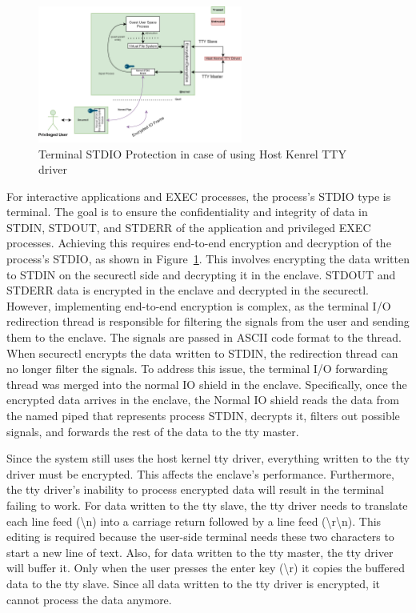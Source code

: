 \begin{figure}[H]
    \centering
    \includegraphics[width=0.6\textwidth]{images/terminal_shiled2.png}
    \caption[Terminal STDIO Protection in case of using Host Kenrel TTY Driver]{Terminal STDIO Protection in case of using Host Kenrel TTY driver}
    \label{fig:terminal_shiled2}
\end{figure}

For interactive applications and EXEC processes, the process's STDIO type is terminal. The goal is to ensure the confidentiality and integrity of data in STDIN, STDOUT, and STDERR of the application and privileged EXEC processes. Achieving this 
requires end-to-end encryption and decryption of the process's STDIO, as shown in Figure~\ref{fig:terminal_shiled2}. This involves encrypting the data written to STDIN on the securectl side and decrypting it in the enclave. STDOUT and STDERR data is encrypted in the enclave and decrypted in the 
securectl. However, implementing end-to-end encryption is complex, as the terminal I/O redirection thread is responsible for filtering the signals from the user and sending them to the enclave. The signals are passed in ASCII code format to the 
thread. When securectl encrypts the data written to STDIN, the redirection thread can no longer filter the signals. To address this issue, the terminal I/O forwarding thread was merged into the normal IO shield in the enclave. Specifically, once 
the encrypted data arrives in the enclave, the Normal IO shield reads the data from the named piped that represents process STDIN, decrypts it, filters out possible signals, and forwards the rest of the data to the tty master.

Since the system still uses the host kernel tty driver, everything written to the tty driver must be encrypted. This affects the enclave's performance. Furthermore, the tty driver's inability to process encrypted data will result in the terminal 
failing to work. For data written to the tty slave, the tty driver needs to translate each line feed (\textbackslash n) into a carriage return followed by a line feed (\textbackslash r\textbackslash n). This editing is required because the user-side terminal needs these two characters 
to start a new line of text. Also, for data written to the tty master, the tty driver will buffer it. Only when the user presses the enter key (\textbackslash r) it copies the buffered data to the tty slave. Since all data written to the tty driver is encrypted, 
it cannot process the data anymore.

